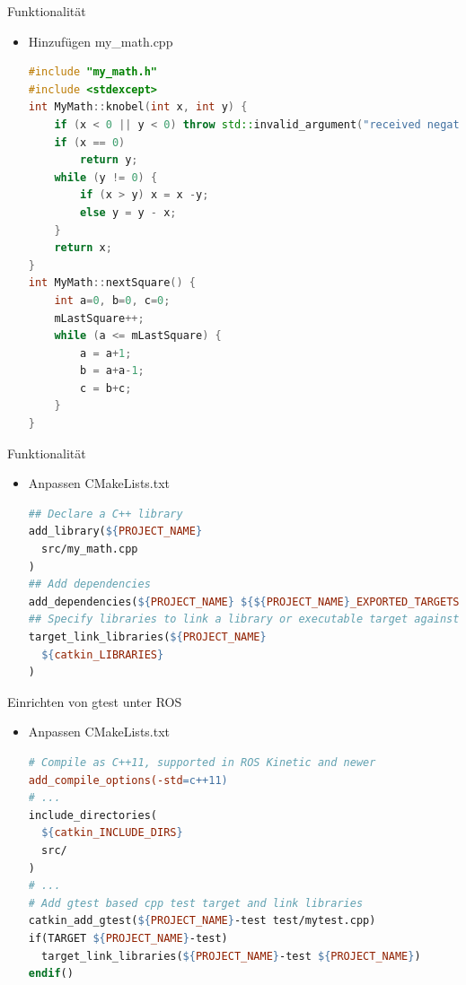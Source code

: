 \documentclass{beamer}
\begin{document}
\begin{frame}[fragile]{Funktionalität}
\begin{itemize}
\item Hinzufügen my\_math.cpp
\begin{lstlisting}[language=c++]
#include "my_math.h"
#include <stdexcept>
int MyMath::knobel(int x, int y) {
	if (x < 0 || y < 0) throw std::invalid_argument("received negative value");
	if (x == 0)
		return y;
	while (y != 0) {
		if (x > y) x = x -y;
		else y = y - x;
	}
	return x;
}
int MyMath::nextSquare() {
	int a=0, b=0, c=0;
	mLastSquare++;
	while (a <= mLastSquare) {
		a = a+1;
		b = a+a-1;
		c = b+c;
	}
}
\end{lstlisting}
\end{itemize}
\end{frame}

\begin{frame}[fragile]{Funktionalität}
\begin{itemize}
\item Anpassen CMakeLists.txt
\begin{lstlisting}[language=make]
## Declare a C++ library
add_library(${PROJECT_NAME}
  src/my_math.cpp
)
## Add dependencies
add_dependencies(${PROJECT_NAME} ${${PROJECT_NAME}_EXPORTED_TARGETS} ${catkin_EXPORTED_TARGETS})
## Specify libraries to link a library or executable target against
target_link_libraries(${PROJECT_NAME}
  ${catkin_LIBRARIES}
)
\end{lstlisting}
\end{itemize}
\end{frame}

\begin{frame}[fragile]{Einrichten von gtest unter ROS}
\begin{itemize}
\item Anpassen CMakeLists.txt
\begin{lstlisting}[language=make]
# Compile as C++11, supported in ROS Kinetic and newer
add_compile_options(-std=c++11)
# ...
include_directories(
  ${catkin_INCLUDE_DIRS}
  src/
)
# ...
# Add gtest based cpp test target and link libraries
catkin_add_gtest(${PROJECT_NAME}-test test/mytest.cpp)
if(TARGET ${PROJECT_NAME}-test)
  target_link_libraries(${PROJECT_NAME}-test ${PROJECT_NAME})
endif()
\end{lstlisting}
\end{itemize}
\end{frame}
\end{document}
